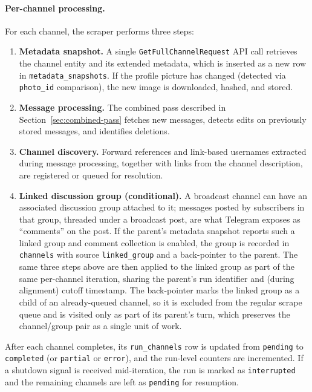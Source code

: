 \paragraph{Per-channel processing.}
For each channel, the scraper performs three steps:
\begin{enumerate}
    \item \textbf{Metadata snapshot.} A single \texttt{GetFullChannelRequest} API call retrieves the channel entity and its extended metadata, which is inserted as a new row in \texttt{metadata\_snapshots}.
    If the profile picture has changed (detected via \texttt{photo\_id} comparison), the new image is downloaded, hashed, and stored.

    \item \textbf{Message processing.} The combined pass described in Section~\ref{sec:combined-pass} fetches new messages, detects edits on previously stored messages, and identifies deletions.

    \item \textbf{Channel discovery.} Forward references and link-based usernames extracted during message processing, together with links from the channel description, are registered or queued for resolution.

    \item \textbf{Linked discussion group (conditional).} A broadcast channel can have an associated discussion group attached to it; messages posted by subscribers in that group, threaded under a broadcast post, are what Telegram exposes as ``comments'' on the post. If the parent's metadata snapshot reports such a linked group and comment collection is enabled, the group is recorded in \texttt{channels} with source \texttt{linked\_group} and a back-pointer to the parent. The same three steps above are then applied to the linked group as part of the same per-channel iteration, sharing the parent's run identifier and (during alignment) cutoff timestamp. The back-pointer marks the linked group as a child of an already-queued channel, so it is excluded from the regular scrape queue and is visited only as part of its parent's turn, which preserves the channel/group pair as a single unit of work.
\end{enumerate}

After each channel completes, its \texttt{run\_channels} row is updated from \texttt{pending} to \texttt{completed} (or \texttt{partial} or \texttt{error}), and the run-level counters are incremented.
If a shutdown signal is received mid-iteration, the run is marked as \texttt{interrupted} and the remaining channels are left as \texttt{pending} for resumption.

